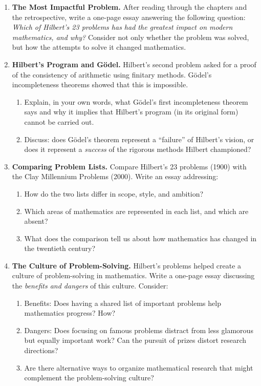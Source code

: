 \begin{enumerate}

    \item \textbf{The Most Impactful Problem.}
    After reading through the chapters and the retrospective, write a one-page essay answering the following question: \emph{Which of Hilbert's 23 problems has had the greatest impact on modern mathematics, and why?} Consider not only whether the problem was solved, but how the attempts to solve it changed mathematics.

    \item \textbf{Hilbert's Program and G\"odel.}
    Hilbert's second problem asked for a proof of the consistency of arithmetic using finitary methods. G\"odel's incompleteness theorems showed that this is impossible.
    \begin{enumerate}
        \item Explain, in your own words, what G\"odel's first incompleteness theorem says and why it implies that Hilbert's program (in its original form) cannot be carried out.
        \item Discuss: does G\"odel's theorem represent a ``failure'' of Hilbert's vision, or does it represent a \emph{success} of the rigorous methods Hilbert championed?
    \end{enumerate}

    \item \textbf{Comparing Problem Lists.}
    Compare Hilbert's 23 problems (1900) with the Clay Millennium Problems (2000). Write an essay addressing:
    \begin{enumerate}
        \item How do the two lists differ in scope, style, and ambition?
        \item Which areas of mathematics are represented in each list, and which are absent?
        \item What does the comparison tell us about how mathematics has changed in the twentieth century?
    \end{enumerate}

    \item \textbf{The Culture of Problem-Solving.}
    Hilbert's problems helped create a culture of problem-solving in mathematics. Write a one-page essay discussing the \emph{benefits and dangers} of this culture. Consider:
    \begin{enumerate}
        \item Benefits: Does having a shared list of important problems help mathematics progress? How?
        \item Dangers: Does focusing on famous problems distract from less glamorous but equally important work? Can the pursuit of prizes distort research directions?
        \item Are there alternative ways to organize mathematical research that might complement the problem-solving culture?
    \end{enumerate}


\end{enumerate}
